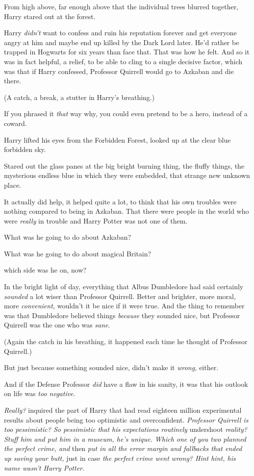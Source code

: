 From high above, far enough above that the individual trees blurred together,
Harry stared out at the forest.

Harry \emph{didn't} want to confess and ruin his reputation forever and get
everyone angry at him and maybe end up killed by the Dark Lord later. He'd
rather be trapped in Hogwarts for six years than face that. That was how he
felt. And so it was in fact helpful, a relief, to be able to cling to a single
decisive factor, which was that if Harry confessed, Professor Quirrell would go
to Azkaban and die there.

(A catch, a break, a stutter in Harry's breathing.)

If you phrased it \emph{that} way{\el} why, you could even pretend to be a
hero, instead of a coward.

Harry lifted his eyes from the Forbidden Forest, looked up at the clear blue
forbidden sky.

Stared out the glass panes at the big bright burning thing, the fluffy things,
the mysterious endless blue in which they were embedded, that strange new
unknown place.

It{\el} actually did help, it helped quite a lot, to think that his own
troubles were nothing compared to being in Azkaban. That there were people in
the world who were \emph{really} in trouble and Harry Potter was not one of
them.

What was he going to do about Azkaban?

What was he going to do about magical Britain?

{\el} which side was he on, now?

In the bright light of day, everything that Albus Dumbledore had said certainly
\emph{sounded} a lot wiser than Professor Quirrell. Better and brighter, more
moral, more \emph{convenient,} wouldn't it be nice if it were true. And the
thing to remember was that Dumbledore believed things \emph{because} they
sounded nice, but Professor Quirrell was the one who was \emph{sane}.

(Again the catch in his breathing, it happened each time he thought of
Professor Quirrell.)

But just because something sounded nice, didn't make it \emph{wrong,} either.

And if the Defense Professor \emph{did} have a flaw in his sanity, it was that
his outlook on life was \emph{too negative.}

\emph{Really?} inquired the part of Harry that had read eighteen million
experimental results about people being too optimistic and overconfident.
\emph{Professor Quirrell is too pessimistic? So pessimistic that his
expectations routinely} undershoot \emph{reality? Stuff him and put him in a
museum, he's unique. Which one of you two planned the perfect crime, and}
then \emph{put in all the error margin and fallbacks that ended up saving your
butt,} just in case \emph{the perfect crime went wrong? Hint hint, his name
wasn't Harry Potter.}

